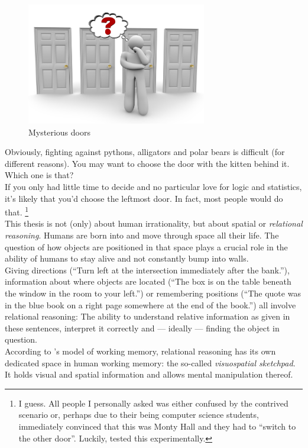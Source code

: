 \documentclass[hidelinks]{scrartcl}
\begin{document}
\begin{figure}[!ht]
	\caption{Mysterious doors}
	\label{fig:mysterious_doors}
	\centering
	\includegraphics[width=0.7\textwidth]{Illustrations/choosing_door.jpg}
\end{figure}

Obviously, fighting against pythons, alligators and polar bears is difficult (for different reasons). You may want to choose the door with the kitten behind it. Which one is that? \\

If you only had little time to decide and no particular love for logic and statistics, it's likely that you'd choose the leftmost door. In fact, most people would do that.
\footnote{I guess. All people I personally asked was either confused by the contrived scenario or, perhaps due to their being computer science students, immediately convinced that this was Monty Hall and they had to ``switch to the other door''. Luckily, \cite{Ragni.2013} tested this experimentally.}  \\

This thesis is not (only) about human irrationality, but about spatial or \textit{relational reasoning}. Humans are born into and move through space all their life. The question of how objects are positioned in that space plays a crucial role in the ability of humans to stay alive and not constantly bump into walls. \\ Giving directions (``Turn left at the intersection immediately after the bank.''), information about where objects are located (``The box is on the table beneath the window in the room to your left.'') or remembering positions (``The quote was in the blue book on a right page somewhere at the end of the book.'') all involve relational reasoning: The ability to understand relative information as given in these sentences, interpret it correctly and — ideally — finding the object in question. \\
According to \cite{Baddeley.2007}'s model of \gls{working memory}, relational reasoning has its own dedicated space in human working memory: the so-called \textit{visuospatial sketchpad}. It holds visual and spatial information and allows mental manipulation thereof. \\
\end{document}
